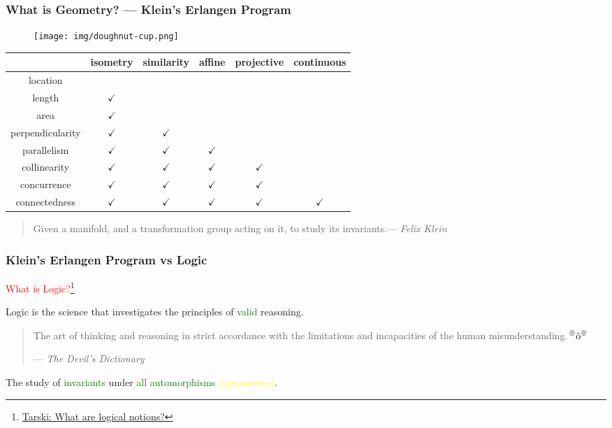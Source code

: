 \documentclass[UTF8,11pt,colorlinks,compress,openany]{beamer}%
\begin{document}
\begin{frame}\frametitle{What is Geometry? --- Klein's Erlangen Program}\vspace{-1ex}
\begin{figure}[H]
\texttt{[image: img/doughnut-cup.png]}
\end{figure}\vspace{-4ex}
	\begin{table}
		\begin{tabu}{c|c|c|c|c|c}
			\hline
		 & isometry & similarity & affine & projective & continuous\\
			\hline
			location & & & & &\\
			\hline
			length & $\checkmark$ & & & &\\
			\hline
			area & $\checkmark$ & & & &\\
			\hline
			perpendicularity & $\checkmark$ & $\checkmark$ & & &\\
			\hline
			parallelism & $\checkmark$ & $\checkmark$ & $\checkmark$ & &\\
			\hline
			collinearity & $\checkmark$ & $\checkmark$ & $\checkmark$ & $\checkmark$ &\\
			\hline
			concurrence & $\checkmark$ & $\checkmark$ & $\checkmark$ & $\checkmark$ &\\
			\hline
			connectedness & $\checkmark$ & $\checkmark$ & $\checkmark$ & $\checkmark$ & $\checkmark$\\
			\hline
		\end{tabu}
	\end{table}\vspace{-1ex}
	\begin{quote}
	Given a manifold, and a transformation group acting on it, to study its invariants.\hfill --- \textsl{Felix Klein}
	\end{quote}
\end{frame}

\begin{frame}\frametitle{Klein's Erlangen Program vs Logic}
	\centerline{\textcolor{red}{\Large What is Logic?}\footnote{\href{https://www.tandfonline.com/doi/abs/10.1080/01445348608837096}{Tarski: What are logical notions?}}}
	\begin{block}{}
		Logic is the science that investigates the principles of \textcolor{green}{valid} reasoning.
	\end{block}
	\centering{}
	\begin{quote}
		The art of thinking and reasoning in strict accordance with the limitations and incapacities of the human misunderstanding.\textcolor{red}{$\sideset{^\circledcirc}{^\circledcirc}{\operatorname{\hat{o}}}$}\par\hfill --- \textsl{The Devil's Dictionary}
	\end{quote}
	\begin{block}{}\centering
		The study of \textcolor{green}{invariants} under \textcolor{green}{all automorphisms} \textcolor{yellow}{(symmetries)}.
	\end{block}
\end{frame}
\end{document}
